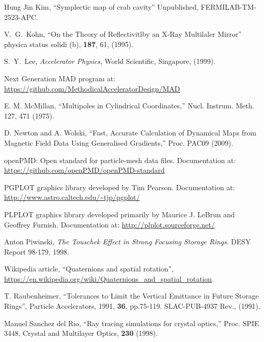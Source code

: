 \begin{thebibliography}{XXXXXXX99}
Hung Jin Kim,
``Symplectic map of crab cavity''
Unpublished, FERMILAB-TM-2523-APC.

V.~G.~Kohn, 
``On the Thcory of Reflectivitlby an X-Ray Multilaler Mirror''
physica status solidi (b), {\bf 187}, 61, (1995).

S.~Y.~Lee,
{\it Accelerator Physics},
World Scientific, Singapore, (1999).

Next Generation MAD program at:
\hfill\break
\hspace*{0.3in}
\url{https://github.com/MethodicalAcceleratorDesign/MAD}

E. M. McMillan, 
``Multipoles in Cylindrical Coordinates,''
Nucl. Instrum. Meth. 127, 471 (1975).

D. Newton and A. Wolski, 
``Fast, Accurate Calculation of Dynamical Maps from
Magnetic Field Data Using Generalised Gradients,''
Proc. PAC09 (2009).

openPMD: Open standard for particle-mesh data files. Documentation at:
\hfill\break
\hspace*{0.3in}
\url{https://github.com/openPMD/openPMD-standard}

PGPLOT graphics library developed by Tim Pearson. Documentation at:
\hfill\break
\hspace*{0.3in}
\url{http://www.astro.caltech.edu/~tjp/pgplot/}

PLPLOT graphics library developed primarily by Maurice J. LeBrun and Geoffrey Furnish. Documentation at:
\hfill\break
\hspace*{0.3in}
\url{http://plplot.sourceforge.net/}

Anton Piwinski, \emph{The Touschek Effect in Strong Focusing Storage Rings}.
DESY Report 98-179, 1998.

Wikipedia article, ``Quaternions and spatial rotation'',
\hfill\break
\hspace*{20pt} 
\url{https://en.wikipedia.org/wiki/Quaternions_and_spatial_rotation}.

T. Raubenheimer,
``Tolerances to Limit the Vertical Emittance in Future Storage Rings'', 
Particle Accelerators, 1991, {\bf 36}, pp.75-119. 
SLAC-PUB-4937 Rev., (1991).

Manuel Sanchez del Rio, ``Ray tracing simulations for crystal optics,''
Proc. SPIE 3448, Crystal and Multilayer Optics, {\bf 230} (1998). 


\end{thebibliography}
